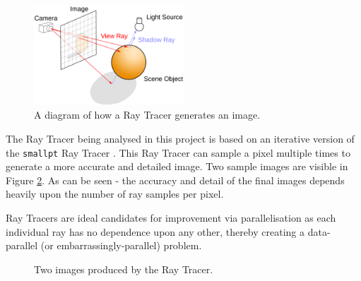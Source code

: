\documentclass[journal,transmag]{IEEEtran}
\begin{document}
		\begin{figure}[h]
			\centering
			\includegraphics[width = 0.5\textwidth]{raytracerDiagram}
			\caption{A diagram of how a Ray Tracer generates an image.}
			\label{fig_ray_tracer_diagram}
		\end{figure}
	
		The Ray Tracer being analysed in this project is based on an iterative version of the \texttt{smallpt} Ray Tracer \cite{smallptG75:online}. This Ray Tracer can sample a pixel multiple times to generate a more accurate and detailed image. Two sample images are visible in Figure \ref{fig_ray_traced_images}. As can be seen - the accuracy and detail of the final images depends heavily upon the number of ray samples per pixel.
		
		Ray Tracers are ideal candidates for improvement via parallelisation as each individual ray has no dependence upon any other, thereby creating a data-parallel (or embarrassingly-parallel) problem.
		
		\begin{figure}[]
			\centering
			\hfil
			\caption{Two images produced by the Ray Tracer.}
			\label{fig_ray_traced_images}
		\end{figure}
		
\end{document}

